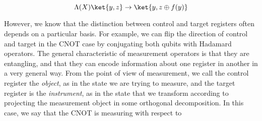 \documentclass{article}
\begin{document}
\begin{equation}
\Lambda(X)\ket{y,z} \rightarrow \ket{y, z \oplus f(y)}
\end{equation}

However, we know that the distinction between control and target registers
often depends on a particular basis. For example, we can flip the direction
of control and target in the CNOT case by conjugating both qubits with
Hadamard operators. The general characteristic of measurement operators
is that they are entangling, and that they can encode information about
one register in another in a very general way.
From the point of view of measurement, we call the control register the
\emph{object}, as in the state we are trying to measure, and the target register
is the \emph{instrument}, as in the state that we transform according to
projecting the measurement object in some orthogonal decomposition.
In this case, we say that the CNOT is measuring with respect to 
\end{document}
